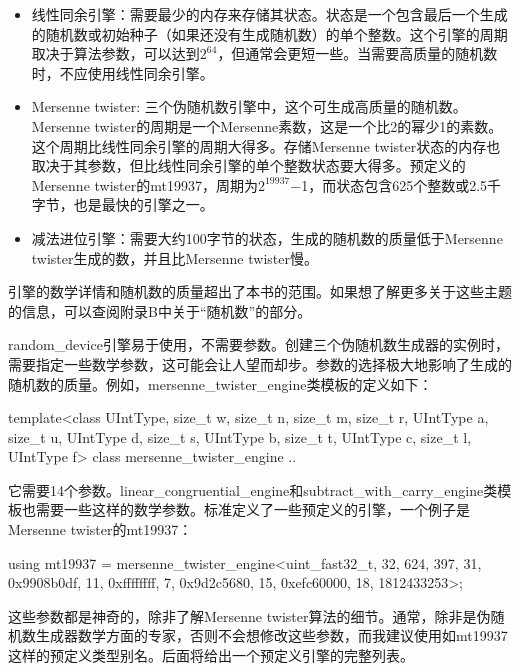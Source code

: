\begin{itemize}
\item
线性同余引擎：需要最少的内存来存储其状态。状态是一个包含最后一个生成的随机数或初始种子（如果还没有生成随机数）的单个整数。这个引擎的周期取决于算法参数，可以达到$2^{64}$，但通常会更短一些。当需要高质量的随机数时，不应使用线性同余引擎。

\item
Mersenne twister: 三个伪随机数引擎中，这个可生成高质量的随机数。Mersenne twister的周期是一个Mersenne素数，这是一个比2的幂少1的素数。这个周期比线性同余引擎的周期大得多。存储Mersenne twister状态的内存也取决于其参数，但比线性同余引擎的单个整数状态要大得多。预定义的Mersenne twister的mt19937，周期为$2^{19937}$−1，而状态包含625个整数或2.5千字节，也是最快的引擎之一。

\item
减法进位引擎：需要大约100字节的状态，生成的随机数的质量低于Mersenne twister生成的数，并且比Mersenne twister慢。
\end{itemize}

引擎的数学详情和随机数的质量超出了本书的范围。如果想了解更多关于这些主题的信息，可以查阅附录B中关于“随机数”的部分。

random\_device引擎易于使用，不需要参数。创建三个伪随机数生成器的实例时，需要指定一些数学参数，这可能会让人望而却步。参数的选择极大地影响了生成的随机数的质量。例如，mersenne\_twister\_engine类模板的定义如下：

\begin{cpp}
template<class UIntType, size_t w, size_t n, size_t m, size_t r,
                UIntType a, size_t u, UIntType d, size_t s,
                UIntType b, size_t t, UIntType c, size_t l, UIntType f>
    class mersenne_twister_engine {..}
\end{cpp}

它需要14个参数。linear\_congruential\_engine和subtract\_with\_carry\_engine类模板也需要一些这样的数学参数。标准定义了一些预定义的引擎，一个例子是Mersenne twister的mt19937：

\begin{cpp}
using mt19937 = mersenne_twister_engine<uint_fast32_t, 32, 624, 397, 31,
    0x9908b0df, 11, 0xffffffff, 7, 0x9d2c5680, 15, 0xefc60000, 18,
    1812433253>;
\end{cpp}

这些参数都是神奇的，除非了解Mersenne twister算法的细节。通常，除非是伪随机数生成器数学方面的专家，否则不会想修改这些参数，而我建议使用如mt19937这样的预定义类型别名。后面将给出一个预定义引擎的完整列表。







